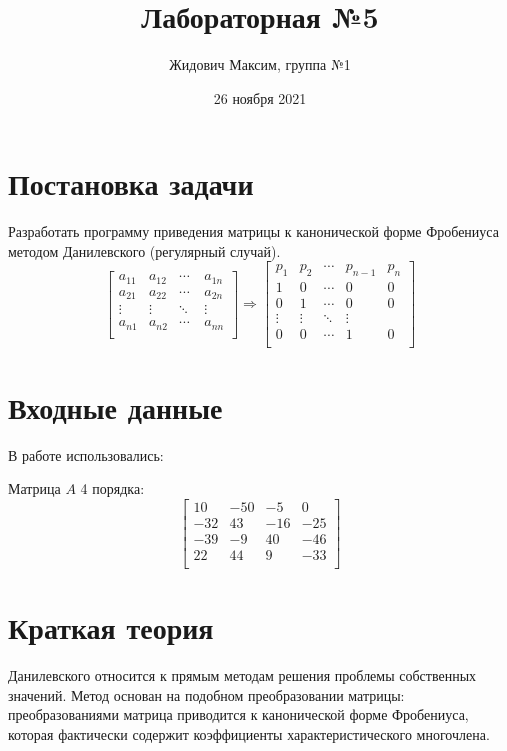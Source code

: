 \documentclass[12pt]{report}
\title{\vspace{-3cm}Лабораторная №5}
\author{Жидович Максим, группа №1}
\date{26 ноября 2021}
\begin{document}
\maketitle

\section{Постановка задачи}

Разработать программу приведения матрицы к канонической форме Фробениуса
методом Данилевского (регулярный случай).
\[
\begin{bmatrix}
a_{11} & a_{12}  & \cdots   & a_{1n}   \\
a_{21} & a_{22}  & \cdots   & a_{2n}  \\
\vdots & \vdots  & \ddots   & \vdots  \\
a_{n1} & a_{n2}  & \cdots\  & a_{nn}  \\
\end{bmatrix}
\Rightarrow
\begin{bmatrix}
p_{1} & p_{2} & \cdots & p_{n-1} & p_{n} \\
1 & 0 & \cdots & 0 & 0 \\
0 & 1 & \cdots & 0 & 0 \\
\vdots & \vdots  & \ddots   & \vdots  \\
0 & 0 & \cdots & 1 & 0 \\
\end{bmatrix}
\]

\section{Входные данные}

В работе использовались:

Матрица $A$ 4 порядка:
\[ 
\begin{bmatrix}
10 & -50  & -5  & 0 \\
-32 & 43 & -16 & -25 \\
-39 & -9 & 40 & -46 \\
22 & 44 & 9 & -33 \\
\end{bmatrix}
\]

\section{Краткая теория}
 Данилевского относится к прямым методам решения проблемы
собственных значений. Метод основан на подобном преобразовании матрицы:
преобразованиями матрица приводится к канонической форме Фробениуса,
которая фактически содержит коэффициенты характеристического
многочлена. 
\end{document}
